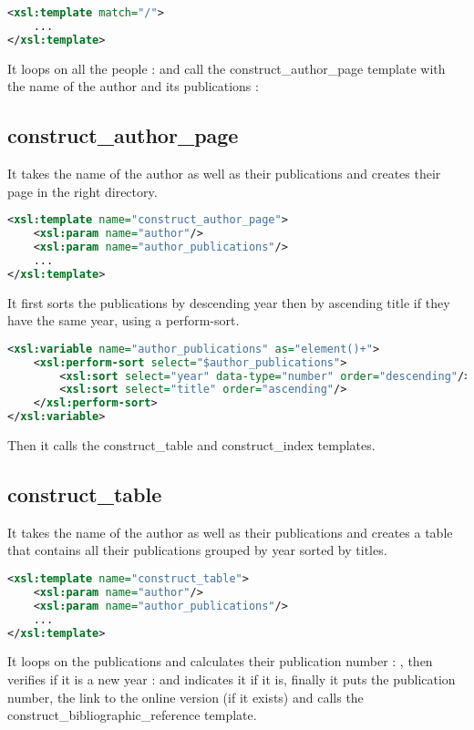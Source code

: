 \documentclass{article}[a4]
\begin{document}
\begin{lstlisting}[language=XML]
<xsl:template match="/">
    ...
</xsl:template>
\end{lstlisting}

It loops on all the people :  and call the construct\_author\_page template with the name of the author and its publications : 

\subsection{construct\_author\_page}
It takes the name of the author as well as their publications and creates their page in the right directory.

\begin{lstlisting}[language=XML]
<xsl:template name="construct_author_page">
	<xsl:param name="author"/>
	<xsl:param name="author_publications"/>
	...
</xsl:template>
\end{lstlisting}

It first sorts the publications by descending year then by ascending title if they have the same year, using a perform-sort.

\begin{lstlisting}[language=XML]
<xsl:variable name="author_publications" as="element()+">
	<xsl:perform-sort select="$author_publications">
		<xsl:sort select="year" data-type="number" order="descending"/>
		<xsl:sort select="title" order="ascending"/>
	</xsl:perform-sort>
</xsl:variable>
\end{lstlisting}

Then it calls the construct\_table and construct\_index templates.


\subsection{construct\_table}
It takes the name of the author as well as their publications and creates a table that contains all their publications grouped by year sorted by titles.

\begin{lstlisting}[language=XML]
<xsl:template name="construct_table">
	<xsl:param name="author"/>
	<xsl:param name="author_publications"/>
	...
</xsl:template>
\end{lstlisting}

It loops on the publications and calculates their publication number : , then verifies if it is a new year :  and indicates it if it is, finally it puts the publication number, the link to the online version (if it exists) and calls the construct\_bibliographic\_reference template.
\end{document}
